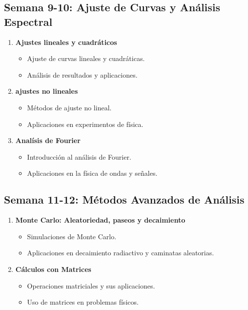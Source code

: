 \documentclass{article}
\begin{document}
\subsection*{Semana 9-10: Ajuste de Curvas y Análisis Espectral}
\begin{enumerate}
    \item \textbf{Ajustes lineales y  cuadráticos}
    \begin{itemize}
        \item Ajuste de curvas lineales y cuadráticas.
        \item Análisis de resultados y aplicaciones.
    \end{itemize}
    \item \textbf{ajustes no lineales }
    \begin{itemize}
        \item Métodos de ajuste no lineal.
        \item Aplicaciones en experimentos de física.
    \end{itemize}
    \item \textbf{Analísis de Fourier }
    \begin{itemize}
        \item Introducción al análisis de Fourier.
        \item Aplicaciones en la física de ondas y señales.
    \end{itemize}
\end{enumerate}

\subsection*{Semana 11-12: Métodos Avanzados de Análisis}
\begin{enumerate}
    \item \textbf{Monte Carlo: Aleatoriedad, paseos y decaimiento}
    \begin{itemize}
        \item Simulaciones de Monte Carlo.
        \item Aplicaciones en decaimiento radiactivo y caminatas aleatorias.
    \end{itemize}
    \item \textbf{Cálculos con Matrices}
    \begin{itemize}
        \item Operaciones matriciales y sus aplicaciones.
        \item Uso de matrices en problemas físicos.
    \end{itemize}
\end{enumerate}
\end{document}
